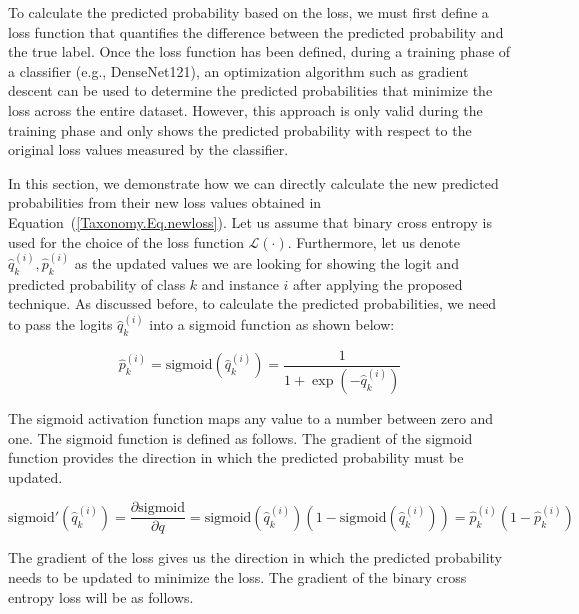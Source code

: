 \documentclass[preprint,3p,times, review]{elsarticle}
\begin{document}
To calculate the predicted probability based on the loss, we must first define a loss function that quantifies the difference between the predicted probability and the true label. Once the loss function has been defined, during a training phase of a classifier (e.g., DenseNet121), an optimization algorithm such as gradient descent can be used to determine the predicted probabilities that minimize the loss across the entire dataset. However, this approach is only valid during the training phase and only shows the predicted probability with respect to the original loss values measured by the classifier.

In this section, we demonstrate how we can directly calculate the new predicted probabilities from their new loss values obtained in Equation~(\ref{Taxonomy.Eq.newloss}). Let us assume that binary cross entropy is used for the choice of the loss function $\mathcal{L}(\cdot) $. Furthermore, let us denote $\widehat{q}_k^{(i)} , \widehat{p}_k^{(i)} $ as the updated values we are looking for showing the logit and predicted probability of class $k $ and instance $i $ after applying the proposed technique. As discussed before, to calculate the predicted probabilities, we need to pass the logits ${\widehat q}_k^{(i)} $ into a sigmoid function as shown below:

\begin{equation}
    \label{Taxonomy.Eq.9.sigmoid}
    \widehat{p}_k^{(i)}=\text{sigmoid}\left(\widehat{q}_k^{(i)}\right)=\frac1{1+\exp\left(-\widehat{q}_k^{(i)}\right)}
\end{equation}


The sigmoid activation function maps any value to a number between zero and one. The sigmoid function is defined as follows. The gradient of the sigmoid function provides the direction in which the predicted probability must be updated.

\begin{equation}
    \label{Taxonomy.Eq.10.SigmoidPrime}
    \text{sigmoid}'\left(\widehat{q}_k^{(i)}\right)=\frac{\partial{\text{sigmoid}}}{\partial{q}}=\text{sigmoid}\left(\widehat{q}_k^{(i)}\right)\left(1-\text{sigmoid}\left(\widehat{q}_k^{(i)}\right)\right)=\widehat{p}_k^{(i)}\left(1-\widehat{p}_k^{(i)}\right)
\end{equation}


The gradient of the loss gives us the direction in which the predicted probability needs to be updated to minimize the loss. The gradient of the binary cross entropy loss will be as follows.
\end{document}
